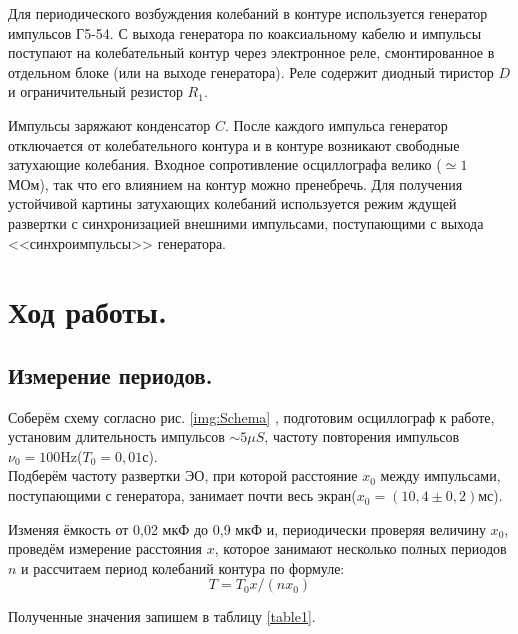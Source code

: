 \documentclass[a4paper, 12pt, twoside]{article}
\begin{document}
Для периодического возбуждения колебаний в контуре используется генератор импульсов Г5-54. С выхода генератора по коаксиальному кабелю и импульсы поступают на колебательный контур через электронное реле, смонтированное в отдельном блоке (или на выходе генератора). Реле содержит диодный тиристор $D$ и ограничительный резистор $R_{1}$.

Импульсы заряжают конденсатор $C$. После каждого импульса генератор отключается от колебательного контура и в контуре возникают свободные затухающие колебания. Входное сопротивление осциллографа велико ($\simeq 1$ МОм), так что его влиянием на контур можно пренебречь. Для получения устойчивой картины затухающих колебаний используется режим ждущей развертки с синхронизацией внешними импульсами, поступающими с выхода <<синхроимпульсы>> генератора.

\section{Ход работы.}

\subsection{Измерение периодов.}
Соберём схему согласно рис. \ref{img:Schema} , подготовим осциллограф к работе, установим длительность импульсов $\sim5\mu S$, частоту повторения импульсов $\nu_{0} = 100\text{Hz}$($T_{0} = 0,01\text{с}$).\\

Подберём частоту развертки ЭО, при которой расстояние $x_{0}$ между импульсами, поступающими с генератора, занимает почти весь экран($x_{0} = (10,4 \pm 0,2)\text{мс}$).

Изменяя ёмкость от 0,02 мкФ до 0,9 мкФ  и, периодически проверяя величину $x_{0}$, проведём измерение расстояния $x$, которое занимают несколько полных периодов $n$ и рассчитаем период колебаний контура по формуле:
\begin{equation} 
T=T_{0}x/(nx_{0})
\end{equation}

Полученные значения запишем в таблицу \ref{table1}.
\end{document}
